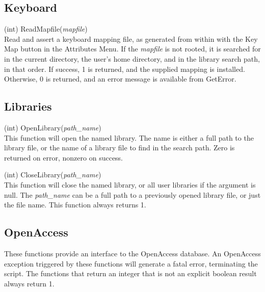 \subsection{Keyboard}

\begin{description}
\item{(int) \vt ReadMapfile({\it mapfile\/})}\\
Read and assert a keyboard mapping file, as generated from within
{\Xic} with the {\cb Key Map} button in the {\cb Attributes Menu}.  If
the {\it mapfile} is not rooted, it is searched for in the current
directory, the user's home directory, and in the library search path,
in that order.  If success, 1 is returned, and the supplied mapping is
installed.  Otherwise, 0 is returned, and an error message is
available from {\vt GetError}.
\end{description}


\subsection{Libraries}

\begin{description}
\item{(int) \vt OpenLibrary({\it path\_name\/})}\\
This function will open the named library.  The name is either a full
path to the library file, or the name of a library file to find in the
search path.  Zero is returned on error, nonzero on success.

\item{(int) \vt CloseLibrary({\it path\_name\/})}\\
This function will close the named library, or all user libraries if
the argument is null.  The {\it path\_name} can be a full path to a
previously opened library file, or just the file name.  This function
always returns 1.

\end{description}


\subsection{OpenAccess}

These functions provide an interface to the OpenAccess database.  An
OpenAccess exception triggered by these functions will generate a
fatal error, terminating the script.  The functions that return an
integer that is not an explicit boolean result always return 1.


